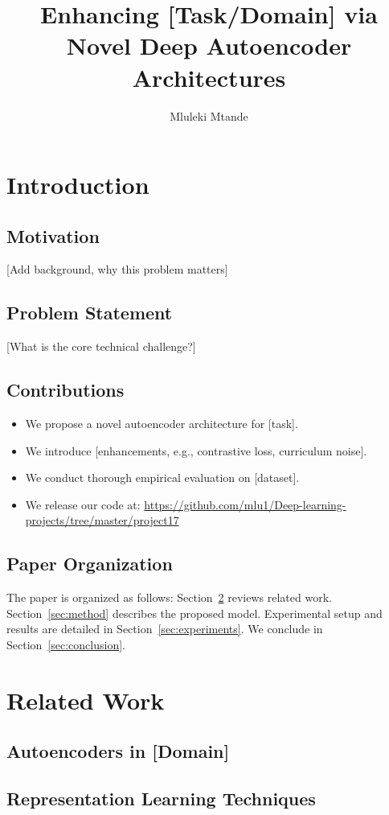 \documentclass[sigconf]{acmart}
\title{Enhancing [Task/Domain] via Novel Deep Autoencoder Architectures}
\author{Mluleki Mtande}
\affiliation{
  \institution{[Your Institution or Independent Researcher]}
  \city{}
  \country{}
}
\begin{document}
\maketitle

\section{Introduction}
\subsection{Motivation}
[Add background, why this problem matters]
\subsection{Problem Statement}
[What is the core technical challenge?]
\subsection{Contributions}
\begin{itemize}
  \item We propose a novel autoencoder architecture for [task].
  \item We introduce [enhancements, e.g., contrastive loss, curriculum noise].
  \item We conduct thorough empirical evaluation on [dataset].
  \item We release our code at: \url{https://github.com/mlu1/Deep-learning-projects/tree/master/project17}
\end{itemize}
\subsection{Paper Organization}
The paper is organized as follows: Section~\ref{sec:related} reviews related work. Section~\ref{sec:method} describes the proposed model. Experimental setup and results are detailed in Section~\ref{sec:experiments}. We conclude in Section~\ref{sec:conclusion}.

\section{Related Work}
\label{sec:related}
\subsection{Autoencoders in [Domain]}
\subsection{Representation Learning Techniques}
\end{document}
